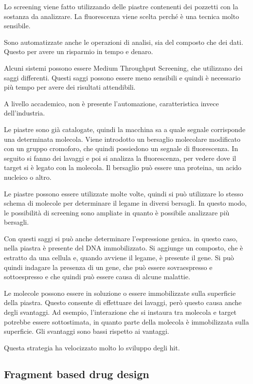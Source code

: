 Lo screening viene fatto utilizzando delle piastre contenenti dei
pozzetti con la sostanza da analizzare. La fluorescenza viene scelta
perché è una tecnica molto sensibile.

Sono automatizzate anche le operazioni di analisi, sia del composto che
dei dati. Questo per avere un risparmio in tempo e denaro.

Alcuni sistemi possono essere Medium Throughput Screening, che
utilizzano dei saggi differenti. Questi saggi possono essere meno
sensibili e quindi è necessario più tempo per avere dei risultati
attendibili.

A livello accademico, non è presente l'automazione, caratteristica
invece dell'industria.

Le piastre sono già catalogate, quindi la macchina sa a quale segnale
corrisponde una determinata molecola. Viene introdotto un bersaglio
molecolare modificato con un gruppo cromoforo, che quindi possiedono un
segnale di fluorescenza. In seguito si fanno dei lavaggi e poi si
analizza la fluorescenza, per vedere dove il target si è legato con la
molecola. Il bersaglio può essere una proteina, un acido nucleico o
altro.

Le piastre possono essere utilizzate molte volte, quindi si può
utilizzare lo stesso schema di molecole per determinare il legame in
diversi bersagli. In questo modo, le possibilità di screening sono
ampliate in quanto è possibile analizzare più bersagli.

Con questi saggi si può anche determinare l'espressione genica. in
questo caso, nella piastra è presente del DNA immobilizzato. Si aggiunge
un composto, che è estratto da una cellula e, quando avviene il legame,
è presente il gene. Si può quindi indagare la presenza di un gene, che
può essere sovraespresso e sottoespresso e che quindi può essere causa
di alcune malattie.

Le molecole possono essere in soluzione o essere immobilizzate sulla
superficie della piastra. Questo consente di effettuare dei lavaggi,
però questo causa anche degli svantaggi. Ad esempio, l'interazione che
si instaura tra molecola e target potrebbe essere sottostimata, in
quanto parte della molecola è immobilizzata sulla superficie. Gli
svantaggi sono bassi rispetto ai vantaggi.

Questa strategia ha velocizzato molto lo sviluppo degli hit.

\subsection{Fragment based drug design}

